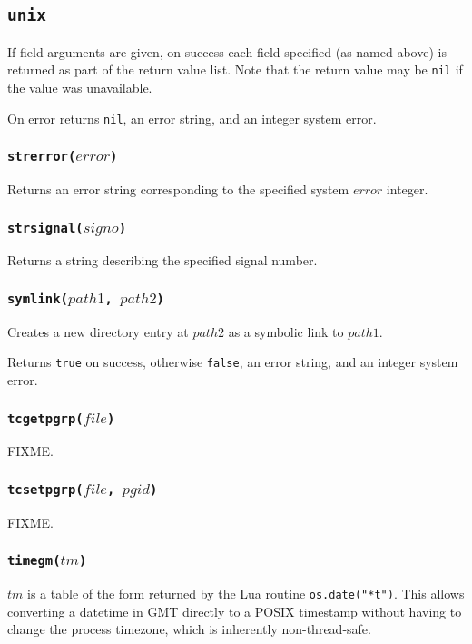 \documentclass[11pt, oneside]{memoir}
\newcommand*{\true}[0]{\texttt{true}\xspace}
\newcommand*{\false}[0]{\texttt{false}\xspace}
\newcommand*{\nil}[0]{\texttt{nil}\xspace}
\newcommand*{\fn}[1]{\texttt{#1}\xspace}
\newcounter{toccols}
\newenvironment{Module}[1]{
	\subsection{\texttt{#1}}
	\addtocontents{toc}{
		\protect\begin{multicols}{\value{toccols}}
	}
}{
	\addtocontents{toc}{\protect\end{multicols}}
}
\begin{document}
\begin{Module}{unix}
If field arguments are given, on success each field specified (as named above) is returned as part of the return value list. Note that the return value may be \nil if the value was unavailable.

On error returns \nil, an error string, and an integer system error.

\subsubsection[\fn{strerror}]{\fn{strerror($error$)}}

Returns an error string corresponding to the specified system $error$ integer.

\subsubsection[\fn{strsignal}]{\fn{strsignal($signo$)}}

Returns a string describing the specified signal number.

\subsubsection[\fn{symlink}]{\fn{symlink($path1$, $path2$)}}

Creates a new directory entry at $path2$ as a symbolic link to $path1$.

Returns \true on success, otherwise \false, an error string, and an integer system error. 

\subsubsection[\fn{tcgetpgrp}]{\fn{tcgetpgrp($file$)}}

FIXME.

\subsubsection[\fn{tcsetpgrp}]{\fn{tcsetpgrp($file$, $pgid$)}}

FIXME.

\subsubsection[\fn{timegm}]{\fn{timegm($tm$)}}

$tm$ is a table of the form returned by the Lua routine \fn{os.date("*t")}. This allows converting a datetime in GMT directly to a POSIX timestamp without having to change the process timezone, which is inherently non-thread-safe.


\end{Module}
\end{document}
